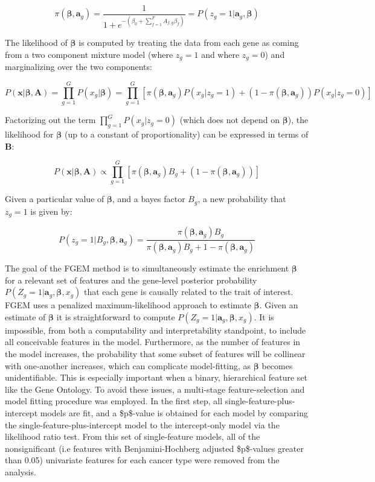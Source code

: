 $$\pi(\boldsymbol{\beta},\textbf{a}_g) =  \frac{1}{1+e^{-(\beta_{0}+\sum_{f=1}^F{A_{f,g}\beta_f})}} =  P(z_g=1|\textbf{a}_g,\boldsymbol{\beta})$$

The likelihood of \(\boldsymbol{\beta}\) is computed by treating the data from each gene as coming from a two component mixture model (where \(z_g=1\) and where \(z_g=0\)) and marginalizing over the two components:

$$ P(\textbf{x}|\boldsymbol{\beta},\textbf{A})=\prod_{g=1}^{G}P(x_g|\boldsymbol{\beta})=\prod_{g=1}^{G}[\pi(\boldsymbol{\beta},\textbf{a}_g) P(x_g|z_g=1)+(1-\pi(\boldsymbol{\beta},\textbf{a}_g))P(x_g|z_g=0)]$$

Factorizing out the term \(\prod_{g=1}^{G} P(x_g|z_g=0)\) (which does not depend on $\boldsymbol{\beta}$), the likelihood for \(\boldsymbol{\beta}\) (up to a constant of proportionality) can be expressed in terms of \(\textbf{B}\):

$$P(\textbf{x}|\boldsymbol{\beta},\textbf{A}) \propto \prod_{g=1}^{G}[\pi(\boldsymbol{\beta},\textbf{a}_g)B_g+(1-\pi(\boldsymbol{\beta},\textbf{a}_g))]$$

Given a particular value of \(\boldsymbol{\beta}\), and a bayes factor \(B_g\),  a new probability that \(z_g=1\) is given by:

$$P(z_g=1 | B_g, \boldsymbol{\beta},\textbf{a}_g) = \frac{\pi(\boldsymbol{\beta},\textbf{a}_g) B_g}{\pi(\boldsymbol{\beta} , \textbf{a}_g) B_g + 1 - \pi(\boldsymbol{\beta},\textbf{a}_g)}$$


The goal of the FGEM method is to simultaneously estimate the enrichment $\boldsymbol{\beta}$ for a relevant set of features and the gene-level posterior probability \(P(Z_g=1|\textbf{a}_g,\boldsymbol{\beta},x_g)\) that each gene is causally related to the trait of interest.  FGEM uses a penalized maximum-likelihood approach to estimate $\boldsymbol{\beta}$.  Given an estimate of $\boldsymbol{\beta}$ it is straightforward to compute \(P(Z_g=1|\textbf{a}_g,\boldsymbol{\beta},x_g)\).
It is impossible, from both a computability and interpretability standpoint, to include all conceivable features in the model.
Furthermore, as the number of features in the model increases, the probability that some subset of features will be collinear with one-another increases,
which can complicate model-fitting, as \(\boldsymbol{\beta}\) becomes unidentifiable. This is especially important when a binary, hierarchical feature set
like the Gene Ontology.  To avoid these issues, a multi-stage feature-selection and model fitting procedure was employed. In the first step, all
single-feature-plus-intercept models are fit, and a \$p\$-value is obtained for each model by comparing the single-feature-plus-intercept model to the intercept-only model via the
likelihood ratio test.  From this set of single-feature models, all of the nonsignificant (i.e features with Benjamini-Hochberg adjusted
\$p\$-values greater than 0.05) univariate features for each cancer type were removed from the analysis.

